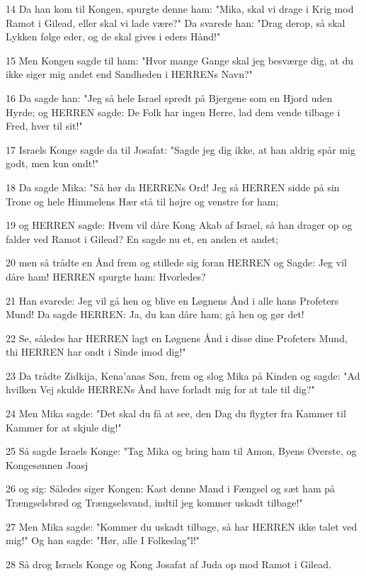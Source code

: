 \par 14 Da han kom til Kongen, spurgte denne ham: "Mika, skal vi drage i Krig mod Ramot i Gilead, eller skal vi lade være?" Da svarede han: "Drag derop, så skal Lykken følge eder, og de skal gives i eders Hånd!"
\par 15 Men Kongen sagde til ham: "Hvor mange Gange skal jeg besværge dig, at du ikke siger mig andet end Sandheden i HERRENs Navn?"
\par 16 Da sagde han: "Jeg så hele Israel spredt på Bjergene som en Hjord uden Hyrde; og HERREN sagde: De Folk har ingen Herre, lad dem vende tilbage i Fred, hver til sit!"
\par 17 Israels Konge sagde da til Josafat: "Sagde jeg dig ikke, at han aldrig spår mig godt, men kun ondt!"
\par 18 Da sagde Mika: "Så hør da HERRENs Ord! Jeg så HERREN sidde på sin Trone og hele Himmelens Hær stå til højre og venstre for ham;
\par 19 og HERREN sagde: Hvem vil dåre Kong Akab af Israel, så han drager op og falder ved Ramot i Gilead? En sagde nu et, en anden et andet;
\par 20 men så trådte en Ånd frem og stillede sig foran HERREN og Sagde: Jeg vil dåre ham! HERREN spurgte ham: Hvorledes?
\par 21 Han svarede: Jeg vil gå hen og blive en Løgnens Ånd i alle hans Profeters Mund! Da sagde HERREN: Ja, du kan dåre ham; gå hen og gør det!
\par 22 Se, således har HERREN lagt en Løgnens Ånd i disse dine Profeters Mund, thi HERREN har ondt i Sinde imod dig!"
\par 23 Da trådte Zidkija, Kena'anas Søn, frem og slog Mika på Kinden og sagde: "Ad hvilken Vej skulde HERRENs Ånd have forladt mig for at tale til dig?"
\par 24 Men Mika sagde: "Det skal du få at see, den Dag du flygter fra Kammer til Kammer for at skjule dig!"
\par 25 Så sagde Israels Konge: "Tag Mika og bring ham til Amon, Byens Øverste, og Kongesønnen Joasj
\par 26 og sig: Således siger Kongen: Kast denne Mand i Fængsel og sæt ham på Trængselsbrød og Trængselsvand, indtil jeg kommer uskadt tilbage!"
\par 27 Men Mika sagde: "Kommer du uskadt tilbage, så har HERREN ikke talet ved mig!" Og han sagde: "Hør, alle I Folkeslag"l!"
\par 28 Så drog Israels Konge og Kong Josafat af Juda op mod Ramot i Gilead.
